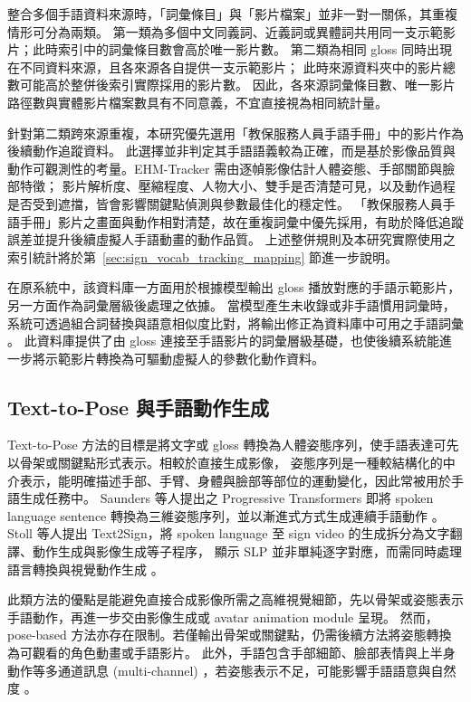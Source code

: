 \documentclass[class=NCU_thesis, crop=false]{standalone}
\begin{document}
整合多個手語資料來源時，「詞彙條目」與「影片檔案」並非一對一關係，其重複情形可分為兩類。
第一類為多個中文同義詞、近義詞或異體詞共用同一支示範影片；此時索引中的詞彙條目數會高於唯一影片數。
第二類為相同 gloss 同時出現在不同資料來源，且各來源各自提供一支示範影片；
此時來源資料夾中的影片總數可能高於整併後索引實際採用的影片數。
因此，各來源詞彙條目數、唯一影片路徑數與實體影片檔案數具有不同意義，不宜直接視為相同統計量。

針對第二類跨來源重複，本研究優先選用「教保服務人員手語手冊」中的影片作為後續動作追蹤資料。
此選擇並非判定其手語語義較為正確，而是基於影像品質與動作可觀測性的考量。EHM-Tracker 需由逐幀影像估計人體姿態、手部關節與臉部特徵；
影片解析度、壓縮程度、人物大小、雙手是否清楚可見，以及動作過程是否受到遮擋，皆會影響關鍵點偵測與參數最佳化的穩定性。
「教保服務人員手語手冊」影片之畫面與動作相對清楚，故在重複詞彙中優先採用，有助於降低追蹤誤差並提升後續虛擬人手語動畫的動作品質。
上述整併規則及本研究實際使用之索引統計將於第~\ref{sec:sign_vocab_tracking_mapping} 節進一步說明。

在原系統中，該資料庫一方面用於根據模型輸出 gloss 播放對應的手語示範影片，另一方面作為詞彙層級後處理之依據。
當模型產生未收錄或非手語慣用詞彙時，系統可透過組合詞替換與語意相似度比對，將輸出修正為資料庫中可用之手語詞彙 \cite{Chu2025SLT}。
此資料庫提供了由 gloss 連接至手語影片的詞彙層級基礎，也使後續系統能進一步將示範影片轉換為可驅動虛擬人的參數化動作資料。


\subsection{Text-to-Pose 與手語動作生成}
\label{subsec:text_to_pose}

Text-to-Pose 方法的目標是將文字或 gloss 轉換為人體姿態序列，使手語表達可先以骨架或關鍵點形式表示。相較於直接生成影像，
姿態序列是一種較結構化的中介表示，能明確描述手部、手臂、身體與臉部等部位的運動變化，因此常被用於手語生成任務中。
Saunders 等人提出之 Progressive Transformers 即將 spoken language sentence 轉換為三維姿態序列，並以漸進式方式生成連續手語動作 \cite{saunders2020progressivetransformers}。
Stoll 等人提出 Text2Sign，將 spoken language 至 sign video 的生成拆分為文字翻譯、動作生成與影像生成等子程序，
顯示 SLP 並非單純逐字對應，而需同時處理語言轉換與視覺動作生成 \cite{stoll2020text2sign}。

此類方法的優點是能避免直接合成影像所需之高維視覺細節，先以骨架或姿態表示手語動作，再進一步交由影像生成或 avatar animation module 呈現。
然而，pose-based 方法亦存在限制。若僅輸出骨架或關鍵點，仍需後續方法將姿態轉換為可觀看的角色動畫或手語影片。
此外，手語包含手部細節、臉部表情與上半身動作等多通道訊息 (multi-channel) ，若姿態表示不足，可能影響手語語意與自然度 \cite{rastgoo2024survey}。
\end{document}
